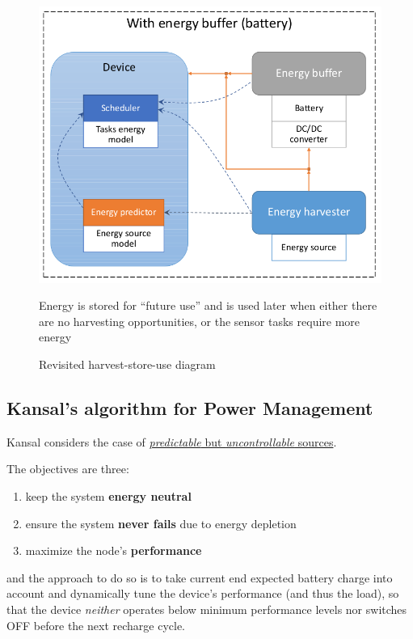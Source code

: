 \begin{figure}[htbp]
   \centering
   \includegraphics{images/harveststoreuse_revisited.png}
   \caption{Revisited harvest-store-use diagram}
   \label{fig:harveststoreuse_revisited}
   Energy is stored for ``future use'' and is used later when either there are no harvesting opportunities, or the sensor tasks require more energy
\end{figure}

\subsection{Kansal's algorithm for Power Management}
Kansal considers the case of \ul{\textit{predictable} but \textit{uncontrollable} sources}.

The objectives are three:
{\ns
\begin{enumerate}
   \item keep the system \textbf{energy neutral}
   \item ensure the system \textbf{never fails} due to energy depletion
   \item maximize the node's \textbf{performance}
\end{enumerate}}
and the approach to do so is to take current end expected battery charge into account and dynamically tune the device’s performance (and thus the load),
so that the device \textit{neither} operates below minimum performance levels nor switches OFF before the next recharge cycle.

\newpage

